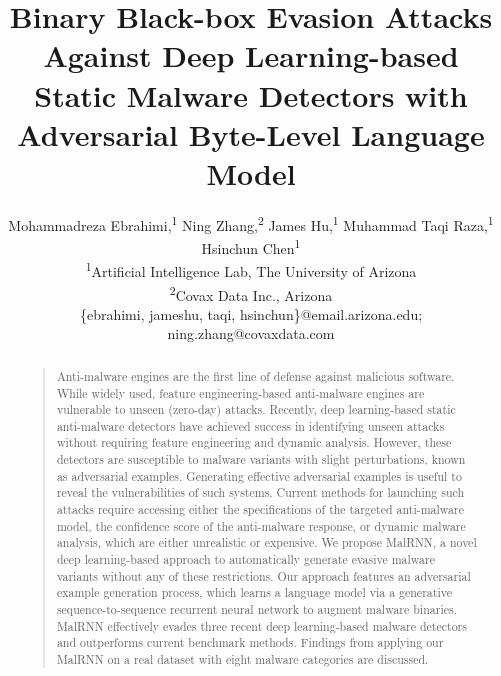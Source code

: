 \documentclass[letterpaper]{article}
\begin{document}
%
\title{Binary Black-box Evasion Attacks Against Deep Learning-based Static Malware Detectors with Adversarial Byte-Level Language Model}


\author{Mohammadreza Ebrahimi,\textsuperscript{1}
Ning Zhang,\textsuperscript{2}
James Hu,\textsuperscript{1}
Muhammad Taqi Raza,\textsuperscript{1}
Hsinchun Chen\textsuperscript{1}\\
\textsuperscript{1}{Artificial Intelligence Lab, The University of Arizona}\\
\textsuperscript{2}{Covax Data Inc., Arizona}\\
\{ebrahimi, jameshu, taqi, hsinchun\}@email.arizona.edu; ning.zhang@covaxdata.com
}


\maketitle
\begin{abstract}
\begin{quote}
Anti-malware engines are the first line of defense against malicious software. While widely used, feature engineering-based anti-malware engines are vulnerable to unseen (zero-day) attacks. Recently, deep learning-based static anti-malware detectors have achieved success in identifying unseen attacks without requiring feature engineering and dynamic analysis. However, these detectors are susceptible to malware variants with slight perturbations, known as adversarial examples. Generating effective adversarial examples is useful to reveal the vulnerabilities of such systems. Current methods for launching such attacks require accessing either the specifications of the targeted anti-malware model, the confidence score of the anti-malware response, or dynamic malware analysis, which are either unrealistic or expensive. We propose MalRNN, a novel deep learning-based approach to automatically generate evasive malware variants without any of these restrictions. Our approach features an adversarial example generation process, which learns a language model via a generative sequence-to-sequence recurrent neural network to augment malware binaries. MalRNN effectively evades three recent deep learning-based malware detectors and outperforms current benchmark methods. Findings from applying our MalRNN on a real dataset with eight malware categories are discussed.
\end{quote}
\end{abstract}
\end{document}

